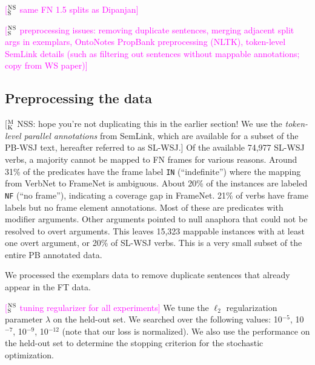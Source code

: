 \documentclass[11pt,a4paper]{article}
\newcommand{\ensuretext}[1]{#1}
\newcommand{\nssmarker}{\ensuretext{\textcolor{magenta}{\ensuremath{^{\textsc{NS}}_{\textsc{S}}}}}}
\newcommand{\mkmarker}{\ensuretext{\textcolor{mdgreen}{\ensuremath{^{\textsc{M}}_{\textsc{K}}}}}}
\newcommand{\arkcomment}[3]{\ensuretext{\textcolor{#3}{[#1 #2]}}}
\newcommand{\nss}[1]{\arkcomment{\nssmarker}{#1}{magenta}}
\newcommand{\mk}[1]{\arkcomment{\mkmarker}{#1}{mdgreen}}
\begin{document}
\nss{same FN 1.5 splits as Dipanjan}


\nss{preprocessing issues: removing duplicate sentences, merging adjacent split args in exemplars, OntoNotes PropBank preprocessing (NLTK), token-level SemLink details (such as filtering out sentences without mappable annotations; copy from WS paper)}

\subsection{Preprocessing the data}


\mk{NSS: hope you're not duplicating this in the earlier section! 
We use the \emph{token-level parallel annotations} from SemLink, which are available for a subset of the PB-WSJ text, 
hereafter referred to as SL-WSJ.} Of the available 74,977 SL-WSJ verbs, a majority cannot be mapped to FN frames for various reasons.
Around 31\% of the predicates have the frame label \texttt{IN} (``indefinite'') where the mapping from VerbNet to FrameNet is ambiguous.
About 20\% of the instances are labeled \texttt{NF} (``no frame''), indicating a coverage gap in FrameNet. 
21\% of verbs have frame labels but no frame element annotations. Most of these are predicates with modifier arguments.
Other arguments pointed to null anaphora that could not be resolved to overt arguments.
This leaves 15,323 mappable instances with at least one overt argument, or 20\% of SL-WSJ verbs. This is a very small
subset of the entire PB annotated data.

We processed the exemplars data to remove duplicate sentences that already appear in the FT data. 



\nss{tuning regularizer for all experiments}
We tune the $\ell_2$ regularization parameter $\lambda$ on the held-out set. We searched over the following
values: 10$^{-5}$, 10$^{-7}$, 10$^{-9}$, 10$^{-12}$ (note that our loss is normalized).
We also use the performance on the held-out set to determine the stopping criterion for the stochastic optimization.
\end{document}
